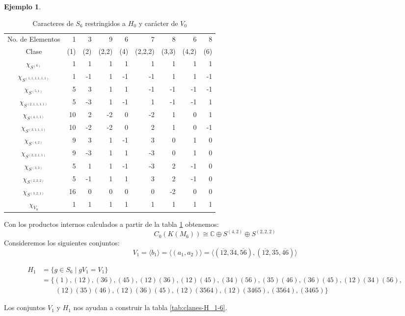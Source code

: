\documentclass[12pt]{book}
\theoremstyle{definition}
\newtheorem{example}[theorem]{Ejemplo}
\newcounter{in}
\begin{document}
\begin{example}
  
  \begin{table}[!hbtp]
    \centering
    \begin{tabular}{c |r r r r r r r r}
      No. de Elementos  & 1 & 3 & 9 & 6 & 7 & 8 & 6 & 8  \\
      Clase&(1)& (2) & (2,2) & (4) & (2,2,2)& (3,3) & (4,2) & (6)\\
      \hline
      $\chi_{S^{{(6)}}}$         & 1 & 1  & 1 & 1 & 1 & 1 & 1 & 1\\
      $\chi_{S^{{(1,1,1,1,1,1)}}}$ & 1 & -1 & 1 & -1&-1 & 1 & 1 &-1\\
      $\chi_{S^{{(5,1)}}}$       & 5 & 3  & 1 & 1 &-1 &-1 &-1 &-1\\
      $\chi_{S^{{(2,1,1,1,1)}}}$  & 5 & -3 & 1 &-1 & 1 &-1  &-1 & 1\\
      $\chi_{S^{{(4,1,1)}}}$     & 10& 2  & -2& 0 &-2 & 1  & 0 & 1\\
      $\chi_{S^{{(3,1,1,1)}}}$    & 10&-2  &-2 & 0 & 2 & 1 & 0 &-1\\
      $\chi_{S^{{(4,2)}}}$       & 9 & 3  & 1 & -1& 3 & 0 & 1 & 0\\
      $\chi_{S^{{(2,2,1,1)}}}$    & 9 & -3 & 1 & 1 &-3 & 0 & 1 & 0\\
      $\chi_{S^{{(3,3)}}}$       & 5 & 1  & 1 &-1 & -3& 2 & -1& 0\\
      $\chi_{S^{{(2,2,2)}}}$     & 5  & -1 & 1 & 1 & 3 & 2 &-1& 0\\
      $\chi_{S^{{(3,2,1)}}}$     & 16 & 0  & 0 & 0 & 0 &-2 & 0& 0\\
      \hline
      $\chi_{V_{0}}$        & 1 & 1 & 1 & 1 & 1 & 1 &1 & 1  \\
    \end{tabular}

    \caption{Caracteres de $S_{6}$ restringidos a $H_{0}$ y carácter de $V_{0}$}
    \label{tab:clanes-H_0-6}
  \end{table}
  Con los productos internos calculados a partir de la tabla
  \ref{tab:clanes-H_0-6} obtenemos:
  \begin{equation}
    C_{0}(K(M_{6}))\cong \mathbb{C}\oplus S^{(4,2)}\oplus S^{(2,2,2)}
    \label{C0-KM6}
  \end{equation}
Consideremos los siguientes conjuntos:
  $$V_{1}=\langle b_{1}\rangle=\langle (a_{1},a_{2})\rangle=\langle(\overline{12},\overline{34},\overline{56}),(\overline{12},\overline{35},\overline{46})\rangle$$
  \begin{footnotesize}
    \begin{align*}
      H_{1}&=\{g\in S_{6}\mid gV_{1}=V_{1}\}\\
      &=\{(1),(12),(36),(45),(12)(36),(12)(45),(34)(56),(35)(46),(36)(45),(12)(34)(56),\\
      &\qquad{}(12)(35)(46),(12)(36)(45),(12)(3564),(12)(3465),(3564),(3465)\}
    \end{align*}
  \end{footnotesize}
  Los conjuntos $V_{1}$ y $H_{1}$ nos ayudan a construir la tabla \ref{tab:clanes-H_1-6}.
  

\end{example}
\end{document}
